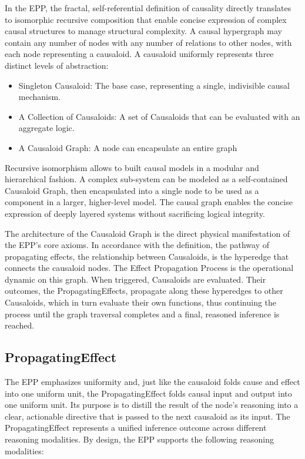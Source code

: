 In the EPP, the fractal, self-referential definition of causality directly translates 
to isomorphic recursive composition that enable concise expression of complex causal structures to manage structural complexity. A causal hypergraph may contain any number of nodes with any number of relations to other nodes, with each node representing a causaloid. A causaloid uniformly represents three distinct levels of abstraction:

\begin{itemize}
 	\item Singleton Causaloid: The base case, representing a single, indivisible causal mechanism.
 	\item A Collection of Causaloids: A set of Causaloids that can be evaluated with an aggregate logic. 
 	\item A Causaloid Graph: A node can encapsulate an entire graph
\end{itemize}

Recursive isomorphism allows to built causal models in a modular and hierarchical fashion. 
A complex sub-system can be modeled as a self-contained Causaloid Graph, then encapsulated into a single node to be used as a component in a larger, higher-level model. The causal graph enables the concise expression of deeply layered systems without sacrificing logical integrity.

The architecture of the Causaloid Graph is the direct physical manifestation of the EPP's core axioms. In accordance with the definition, the pathway of propagating effects, the relationship between Causaloids, is the hyperedge that connects the causaloid nodes. The Effect Propagation Process is the operational dynamic on this graph. When triggered, Causaloids are evaluated. Their outcomes, the PropagatingEffects, propagate along these hyperedges to other Causaloids, which in turn evaluate their own functions, thus continuing the process until the graph traversal completes and a final, reasoned inference is reached.

%
%
\subsection{PropagatingEffect}
\label{sec:propagating_effect}

The EPP emphasizes uniformity and, just like the causaloid folds cause and effect into one uniform unit, the PropagatingEffect folds causal input and output into one uniform unit. Its purpose is to distill the result of the node's reasoning into a clear, actionable directive that is passed to the next causaloid as its input. The PropagatingEffect represents a unified inference outcome across different reasoning modalities. By design, the EPP supports the following reasoning modalities:

